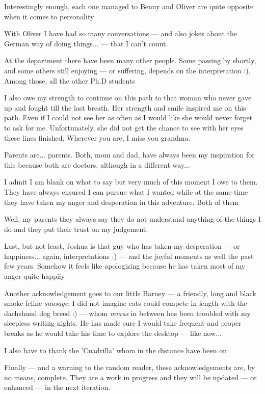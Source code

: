 Interestingly enough, each one managed to Benny and Oliver are quite opposite when it comes to personality 

With Oliver I have had 
so many conversations --- and also jokes about the German way of doing things... --- 
that I can't count.

At the department there have been many other people. Some passing by shortly, and 
some others still enjoying --- or suffering, depends on the interpretation :). Among 
those, all the other Ph.D students 

I also owe my strength to continue on this path to that woman who never gave up 
and fought till the last breath. Her strength and smile inspired me on this path.
Even if I could not see her as often as I would like she would never forget to ask 
for me. Unfortunately, she did not get the chance to see with her eyes these lines 
finished. Wherever you are, I miss you grandma.

Parents are... parents. Both, mom and dad, have always been my inspiration for this 
because both are doctors, although in a different way... 

I admit I am blank on what to say but very much of this 
moment I owe to them. They have always ensured I can pursue what I wanted while 
at the same time they have taken my anger and desperation in this adventure. Both 
of them 

Well, my parents they always say they do not understand 
anything of the things I do and they put their trust on my judgement. 

Last, but not least, Joshua is that guy who has taken my desperation --- or happiness... 
again, interpretations :) --- and the joyful moments as well the past few years. 
Somehow it feels like apologizing because he has taken most of my anger quite happily 

Another acknowledgement goes to our little Barney --- a friendly, long and black 
smoke feline \emph{sausage}; I did not imagine cats could compete in length with 
the dachshund dog breed :) --- whom \emph{miaus} in between has been troubled with 
my sleepless writing nights. He has made sure I would take frequent and proper breaks 
as he would take his time to explore the desktop --- like now...

I also have to thank the 'Cuadrilla' whom in the distance have been on

Finally --- and a warning to the random reader, these acknowledgements are, by no 
means, complete. They are a work in progress and they will be updated --- or enhanced ---
in the next iteration.

